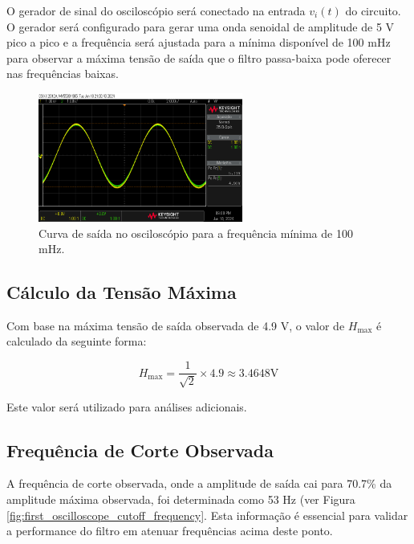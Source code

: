 \documentclass[
	12pt,				%
	openright,			%
	twoside,			%
	a4paper,			%
	english,			%
	french,				%
	spanish,			%
	brazil,				%
	]{abntex2}
\begin{document}
O gerador de sinal do osciloscópio será conectado na entrada \( v_i(t) \) do circuito. O gerador será configurado para gerar uma onda senoidal de amplitude de 5 V pico a pico e a frequência será ajustada para a mínima disponível de 100 mHz para observar a máxima tensão de saída que o filtro passa-baixa pode oferecer nas frequências baixas.

\begin{figure}[H]
    \centering
    \includegraphics[width=0.6\textwidth]{imgs/first_oscilloscope_low_frequency_output.jpg}
    \caption{Curva de saída no osciloscópio para a frequência mínima de 100 mHz.}
    \label{fig:low_frequency_output}
\end{figure}

\subsection{Cálculo da Tensão Máxima}

Com base na máxima tensão de saída observada de 4.9 V, o valor de \( H_{\text{max}} \) é calculado da seguinte forma:

\begin{equation}
H_{\text{max}} = \frac{1}{\sqrt{2}} \times 4.9 \approx 3.4648 \text{V}
\end{equation}

Este valor será utilizado para análises adicionais.


\subsection{Frequência de Corte Observada}
A frequência de corte observada, onde a amplitude de saída cai para 70.7\% da amplitude máxima observada, foi determinada como 53 Hz (ver Figura \ref{fig:first_oscilloscope_cutoff_frequency}. Esta informação é essencial para validar a performance do filtro em atenuar frequências acima deste ponto.
\end{document}

